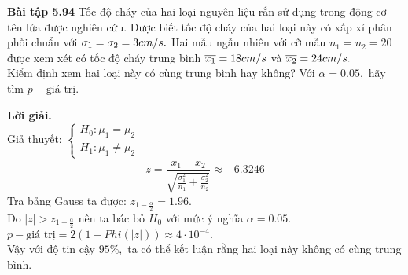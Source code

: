 \begin{mybox}
\textbf{Bài tập 5.94} Tốc độ cháy của hai loại nguyên liệu rắn sử dụng trong động cơ tên lửa được nghiên cứu. Được biết tốc độ cháy của hai loại này có xấp xỉ phân phối chuẩn với $\sigma_1 = \sigma_2 = 3 {{cm} \mathord{\left/
 {\vphantom {{cm} s}} \right.
 \kern-\nulldelimiterspace} s}.$ Hai mẫu ngẫu nhiên với cỡ mẫu $n_1 = n_2 = 20$ được xem xét có tốc độ cháy trung bình $\overline{x_1} = 18 {{cm} \mathord{\left/
 {\vphantom {{cm} s}} \right.
 \kern-\nulldelimiterspace} s}$ và $\overline{x_2} = 24 {{cm} \mathord{\left/
 {\vphantom {{cm} s}} \right.
 \kern-\nulldelimiterspace} s}.$\\
Kiểm định xem hai loại này có cùng trung bình hay không? Với $\alpha = 0.05,$ hãy tìm $p-\text{giá trị}.$
\end{mybox}
\textbf{Lời giải.} \\
Giả thuyết: $\begin{cases}
H_0: \mu_1 = \mu_2\\
H_1: \mu_1 \ne \mu_2
\end{cases}$\\
$$z = \frac{{\overline {{x_1}}  - \overline {{x_2}} }}{{\sqrt {\frac{{\sigma _1^2}}{{{n_1}}} + \frac{{\sigma _2^2}}{{{n_2}}}} }} \approx -6.3246$$
Tra bảng Gauss ta được: $z_{1 - \frac{\alpha}{2}} = 1.96.$\\
Do $\left| z \right| > z_{1 - \frac{\alpha}{2}}$ nên ta bác bỏ $H_0$ với mức ý nghĩa $\alpha = 0.05.$\\
$p-\text{giá trị} = 2 \left( {1 - Phi \left( {\left| z \right|} \right)} \right) \approx  4 \cdot 10^{-4}.$\\
Vậy với độ tin cậy $95\%,$ ta có thể kết luận rằng hai loại này không có cùng trung bình.


